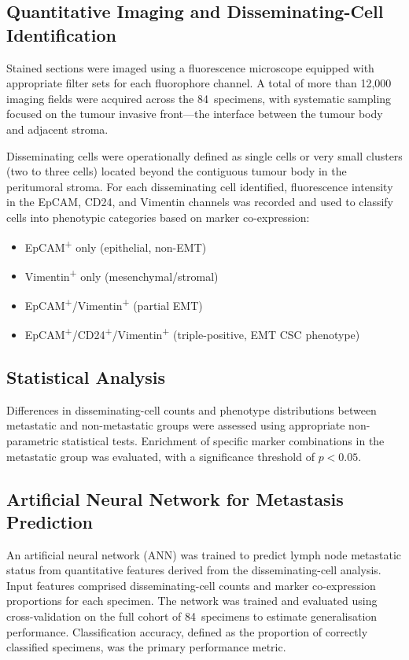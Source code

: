 \documentclass[11pt,a4paper]{article}
\begin{document}
\subsection{Quantitative Imaging and Disseminating-Cell Identification}

Stained sections were imaged using a fluorescence microscope equipped with appropriate filter sets for each fluorophore channel. A total of more than 12{,}000 imaging fields were acquired across the 84~specimens, with systematic sampling focused on the tumour invasive front---the interface between the tumour body and adjacent stroma.

Disseminating cells were operationally defined as single cells or very small clusters (two to three cells) located beyond the contiguous tumour body in the peritumoral stroma. For each disseminating cell identified, fluorescence intensity in the EpCAM, CD24, and Vimentin channels was recorded and used to classify cells into phenotypic categories based on marker co-expression:

\begin{itemize}
    \item EpCAM\textsuperscript{+} only (epithelial, non-EMT)
    \item Vimentin\textsuperscript{+} only (mesenchymal/stromal)
    \item EpCAM\textsuperscript{+}/Vimentin\textsuperscript{+} (partial EMT)
    \item EpCAM\textsuperscript{+}/CD24\textsuperscript{+}/Vimentin\textsuperscript{+} (triple-positive, EMT CSC phenotype)
\end{itemize}

\subsection{Statistical Analysis}

Differences in disseminating-cell counts and phenotype distributions between metastatic and non-metastatic groups were assessed using appropriate non-parametric statistical tests. Enrichment of specific marker combinations in the metastatic group was evaluated, with a significance threshold of $p < 0.05$.

\subsection{Artificial Neural Network for Metastasis Prediction}

An artificial neural network (ANN) was trained to predict lymph node metastatic status from quantitative features derived from the disseminating-cell analysis. Input features comprised disseminating-cell counts and marker co-expression proportions for each specimen. The network was trained and evaluated using cross-validation on the full cohort of 84~specimens to estimate generalisation performance. Classification accuracy, defined as the proportion of correctly classified specimens, was the primary performance metric.
\end{document}

